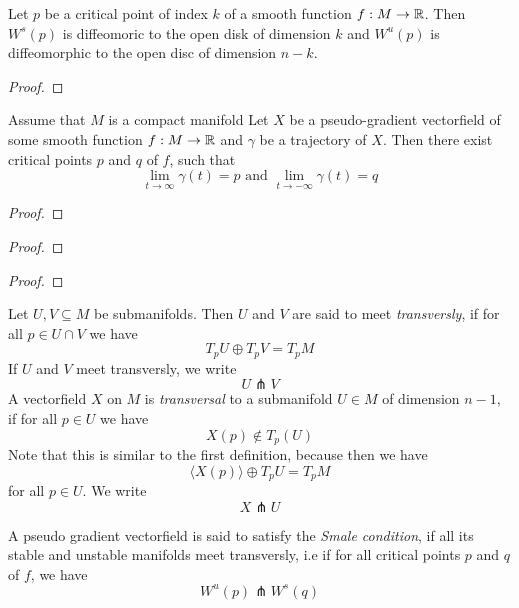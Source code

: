 \begin{prop}
    Let $p$ be a critical point of index $k$ of a smooth function $f: M \to { \mathbb R }$. Then
    $W^s(p)$ is diffeomoric to the open disk of dimension $k$ and $W^u(p)$ is diffeomorphic
    to the open disc of dimension $n - k$.
\end{prop}

\begin{proof}
\end{proof}

\begin{prop}
    Assume that $M$ is a compact manifold Let $X$ be a pseudo-gradient vectorfield of some
    smooth function $f: M \to { \mathbb R }$ and $\gamma$ be a trajectory of $X$. Then there
    exist critical points $p$ and $q$ of $f$, such that
    \[ \lim_{t \to \infty} \gamma(t) = p \text{ and } \lim_{t \to -\infty} \gamma(t) = q \]
\end{prop}

\begin{proof}
\end{proof}

\begin{theorem}
\end{theorem}

\begin{proof}
\end{proof}

\begin{theorem}
\end{theorem}

\begin{proof}
\end{proof}

\begin{definition}[Transversality]
    Let $U, V \subseteq M$ be submanifolds. Then $U$ and $V$ are said to meet 
    \textit{transversly}, if for all $p \in U \cap V$ we have
    \[ T_pU \oplus T_pV = T_pM \]
    If $U$ and $V$ meet transversly, we write
    \[ U \pitchfork V \]
    A vectorfield $X$ on $M$ is \textit{transversal} to a submanifold $U \in M$ of dimension
    $n - 1$, if for all $p \in U$ we have 
    \[ X(p) \notin T_p(U) \]
    Note that this is similar to the first definition, because then we have
    \[ \langle X(p) \rangle \oplus T_pU = T_pM \]
    for all $p \in U$.
    We write 
    \[ X \pitchfork U \]
\end{definition}

\begin{definition}
    A pseudo gradient vectorfield is said to satisfy the \textit{Smale condition}, if
    all its stable and unstable manifolds meet transversly, i.e if for all critical points
    $p$ and $q$ of $f$, we have
    \[ W^u(p) \pitchfork W^s(q) \]
\end{definition}